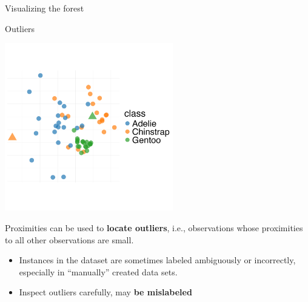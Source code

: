 \documentclass[11pt,compress,t,notes=noshow, xcolor=table]{beamer}
\begin{document}
\begin{vbframe}{Visualizing the forest}
\end{vbframe}

\begin{vbframe}{Outliers}
\vspace{-6ex}
\begin{center}
\includegraphics[width=0.55\textwidth]{figure/forest-prox-vis_2.png}
\end{center}
\vspace{-4ex}

Proximities can be used to \textbf{locate outliers}, i.e., observations whose proximities to all other observations are small.

\begin{itemize}
\item Instances in the dataset are sometimes labeled ambiguously or incorrectly, especially in \enquote{manually} created data sets.
\item Inspect outliers carefully, may \textbf{be mislabeled}
\end{itemize}
\end{vbframe}
\end{document}
